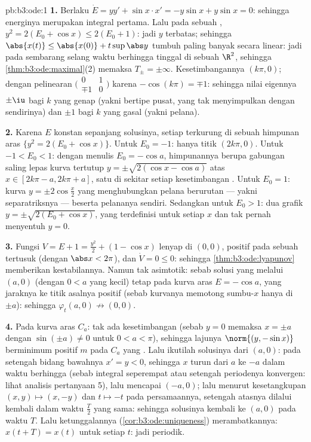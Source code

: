 \begin{solution}{pb:b3:ode:1}
\textbf{1.} Berlaku $\dot E = yy' + \sin x\cdot x' = -y\sin x +
y\sin x = 0$: sehingga energinya merupakan integral pertama. Lalu pada sebuah
, $y^2 = 2(E_0 + \cos x) \leq 2(E_0 + 1)$: jadi $y$
terbatas; sehingga $\abs{x(t)} \leq \abs{x(0)} +
t\sup\abs y$ tumbuh paling banyak secara linear: jadi pada sembarang selang waktu
berhingga  tinggal di sebuah  $\R^2$, sehingga
\cref{thm:b3:ode:maximal}(2) memaksa $T_\pm = \pm\infty$.
Kesetimbangannya $(k\pi, 0)$; dengan pelinearan
$\bigl(\begin{smallmatrix}0&1\\
\mp1&0\end{smallmatrix}\bigr)$ karena $-\cos(k\pi) = \mp1$:
sehingga nilai eigennya $\pm\iu$ bagi $k$ yang genap (yakni bertipe pusat, yang tak menyimpulkan
dengan sendirinya) dan $\pm1$ bagi $k$ yang gasal (yakni pelana).

\textbf{2.} Karena $E$ konstan sepanjang solusinya, setiap
 terkurung di sebuah himpunan aras $\{y^2 = 2(E_0 + \cos x)\}$. Untuk
$E_0 = -1$: hanya titik $(2k\pi, 0)$. Untuk $-1 < E_0 <
1$: dengan menulis $E_0 = -\cos a$, himpunannya berupa gabungan saling lepas
kurva tertutup $y = \pm\sqrt{2(\cos x - \cos a)}$ atas $x \in
[2k\pi - a, 2k\pi + a]$, satu di sekitar setiap kesetimbangan .
Untuk $E_0 = 1$: kurva $y = \pm2\cos\frac x2$ yang menghubungkan
pelana berurutan --- yakni separatriksnya --- beserta
pelananya sendiri. Sedangkan untuk $E_0 > 1$: dua grafik $y =
\pm\sqrt{2(E_0 + \cos x)}$, yang terdefinisi untuk setiap $x$ dan tak pernah
menyentuh $y = 0$.

\textbf{3.} Fungsi $V = E + 1 = \frac{y^2}2 + (1 - \cos x)$
lenyap di $(0,0)$, positif pada sebuah  tertusuk
(dengan $\abs x < 2\pi$), dan $\dot V = 0 \leq 0$:
sehingga \cref{thm:b3:ode:lyapunov} memberikan kestabilannya. Namun tak asimtotik:
sebab solusi yang melalui $(a, 0)$ (dengan $0 < a$ yang kecil) tetap pada
kurva aras $E = -\cos a$, yang jaraknya ke titik asalnya
positif (sebab kurvanya memotong sumbu-$x$ hanya di $\pm a$):
sehingga $\varphi_t(a, 0) \not\to (0,0)$.

\textbf{4.} Pada kurva aras $C_a$: tak ada kesetimbangan (sebab $y = 0$
memaksa $x = \pm a$ dengan $\sin(\pm a) \neq 0$ untuk $0 < a <
\pi$), sehingga lajunya $\norm{(y, -\sin x)}$ berminimum positif
$m$ pada $C_a$ yang . Lalu ikutilah solusinya dari
$(a, 0)$: pada setengah bidang bawahnya $x' = y < 0$, sehingga $x$
turun dari $a$ ke $-a$ dalam waktu berhingga (sebab integral seperempat
atau setengah periodenya konvergen: lihat analisis pertanyaan 5), lalu mencapai
$(-a, 0)$; lalu menurut kesetangkupan $(x, y) \mapsto (x, -y)$ dan $t
\mapsto -t$ pada persamaannya, setengah atasnya dilalui
kembali dalam waktu $\frac T2$ yang sama: sehingga solusinya kembali ke
$(a, 0)$ pada waktu $T$. Lalu ketunggalannya
(\cref{cor:b3:ode:uniqueness}) merambatkannya: $x(t + T) =
x(t)$ untuk setiap $t$: jadi periodik.


\end{solution}
